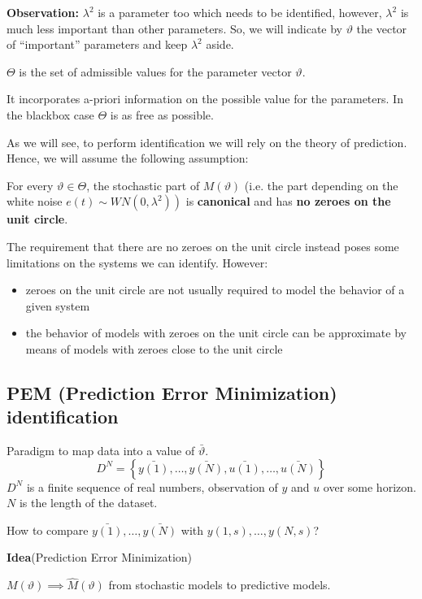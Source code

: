 \textbf{Observation:} $\lambda^2$ is a parameter too which needs to be identified, however, $\lambda^2$ is much less important than other parameters. So, we will indicate by $\vartheta$ the vector of “important” 
parameters and keep $\lambda^2$ aside.

$\Theta$ is the set of admissible values for the parameter vector $\vartheta$.

It incorporates a-priori information on the possible value for the 
parameters. In the blackbox case $\Theta$ is as free as possible.

As we will see, to perform identification we will rely on the theory of 
prediction. Hence, we will assume the following assumption:

For every $\vartheta \in \Theta$, the stochastic part of $M(\vartheta)$ (i.e. the part depending on the white noise $\left.e(t) \sim W N\left(0, \lambda^{2}\right)\right)$ is \textbf{canonical} and has \textbf{no zeroes on the unit circle}.

The requirement that there are no zeroes on the unit circle instead 
poses some limitations on the systems we can identify. However:
\begin{itemize}
	\item zeroes on the unit circle are not usually required to model the 
	behavior of a given system
	\item the behavior of models with zeroes on the unit circle can be 
	approximate by means of models with zeroes close to the unit 
	circle
\end{itemize} 

\subsection{PEM (Prediction Error Minimization) identification}
Paradigm to map data into a value of $\bar{\vartheta}$.
$$
D^N=\left\{\bar{y(1)},\ldots,\bar{y(N)},\bar{u(1)},\ldots,\bar{u(N)}\right\}
$$
$D^N$ is a finite sequence of real numbers, observation of $y$ and $u$ over some horizon. $N$ is the length of the dataset.


How to compare $\bar{y(1)},\ldots,\bar{y(N)}$ with $y(1,s),\ldots,y(N,s)$?


\textbf{Idea}(Prediction Error Minimization)

$M(\vartheta)\implies \hat{M}(\vartheta)$ from stochastic models to predictive models.


